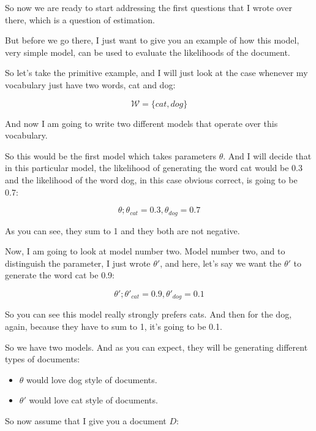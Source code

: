 \documentclass[a4paper, 12pt]{article}
\begin{document}
So now we are ready to start addressing the first questions
that I wrote over there, which is a question of estimation.

But before we go there, I just want
to give you an example of how this model, very simple model,
can be used to evaluate the likelihoods of the document.

So let's take the primitive example,
and I will just look at the case whenever my vocabulary just
have two words, cat and dog:

\begin{equation}
\mathcal{W} = \{cat, dog\}
\end{equation}

And now I am going to write two different models that operate over this
vocabulary.

So this would be the first model which takes parameters \(\theta\). And I will
decide that in this particular model, the likelihood of generating the word cat
would be 0.3 and the likelihood of the word dog, in this case obvious correct,
is going to be 0.7:

\begin{equation}
\theta ; \theta_{cat}=0.3 , \theta_{dog}=0.7
\end{equation}

As you can see, they sum to 1 and they both are not negative.

Now, I am going to look at model number two. Model number two, and to
distinguish the parameter, I just wrote \({\theta}'\), and here, let's say we
want the \({\theta}'\) to generate the word cat be 0.9:

\begin{equation}
{\theta}' ; {\theta}'_{cat}=0.9 , {\theta}'_{dog}=0.1
\end{equation}

So you can see this model really strongly prefers cats.
And then for the dog, again, because they have to sum to 1,
it's going to be 0.1.

So we have two models.
And as you can expect, they will be generating
different types of documents:

\begin{itemize}
\item \(\theta\) would love dog style of documents.
\item \({\theta}'\) would love cat style of documents.
\end{itemize}

So now assume that I give you a document \(D\):
\end{document}
